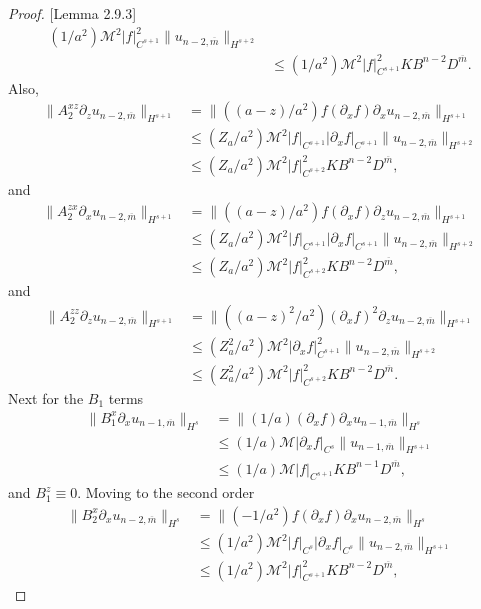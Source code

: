 \begin{proof}{[Lemma 2.9.3]}
\begin{align*}
(1/a^2)\mathcal{M}^2|f|_{C^{s+1}}^2\|u_{n-2, \overline{m}}\|_{H^{s+2}} \\&\le
(1/a^2)\mathcal{M}^2|f|_{C^{s+1}}^2KB^{n-2}D^{\overline{m}}.
\end{align*}
Also,
\begin{align*}
\|A_2^{xz}\partial_z u_{n-2,\overline{m}}\|_{H^{s+1}} &= 
\|((a-z)/a^2)f(\partial_x f)\partial_x u_{n-2,\overline{m}}\|_{H^{s+1}}\\&\le
(Z_a/a^2)\mathcal{M}^2|f|_{C^{s+1}}|\partial_x f|_{C^{s+1}}\|u_{n-2, \overline{m}}\|_{H^{s+2}} \\&\le
(Z_a/a^2)\mathcal{M}^2|f|_{C^{s+2}}^2KB^{n-2}D^{\overline{m}},
\end{align*}
and
\begin{align*}
\|A_2^{zx}\partial_x u_{n-2,\overline{m}}\|_{H^{s+1}} &= 
\|((a-z)/a^2)f(\partial_x f)\partial_z u_{n-2,\overline{m}}\|_{H^{s+1}}\\&\le
(Z_a/a^2)\mathcal{M}^2|f|_{C^{s+1}}|\partial_x f|_{C^{s+1}}\|u_{n-2, \overline{m}}\|_{H^{s+2}} \\&\le
(Z_a/a^2)\mathcal{M}^2|f|_{C^{s+2}}^2KB^{n-2}D^{\overline{m}},
\end{align*}
and
\begin{align*}
\|A_2^{zz}\partial_z u_{n-2,\overline{m}}\|_{H^{s+1}} &= 
\|((a-z)^2/a^2)(\partial_x f)^2\partial_z u_{n-2,\overline{m}}\|_{H^{s+1}}\\&\le
(Z_a^2/a^2)\mathcal{M}^2|\partial_x f|_{C^{s+1}}^2\|u_{n-2, \overline{m}}\|_{H^{s+2}} \\&\le
(Z_a^2/a^2)\mathcal{M}^2|f|_{C^{s+2}}^2KB^{n-2}D^{\overline{m}}.
\end{align*}
Next for the $B_1$ terms
\begin{align*}
\|B_1^{x}\partial_x u_{n-1,\overline{m}}\|_{H^{s}} &= 
\|(1/a)(\partial_x f)\partial_x u_{n-1,\overline{m}}\|_{H^{s}}\\&\le
(1/a)\mathcal{M}|\partial_x f|_{C^{s}}\|u_{n-1, \overline{m}}\|_{H^{s+1}} \\&\le
(1/a)\mathcal{M}|f|_{C^{s+1}}KB^{n-1}D^{\overline{m}},
\end{align*}
and $B_1^z\equiv 0$. Moving to the second order
\begin{align*}
\|B_2^{x}\partial_x u_{n-2,\overline{m}}\|_{H^{s}} &= 
\|(-1/a^2)f(\partial_x f)\partial_x u_{n-2,\overline{m}}\|_{H^{s}}\\&\le
(1/a^2)\mathcal{M}^2|f|_{C^{s}}|\partial_x f|_{C^{s}}\|u_{n-2, \overline{m}}\|_{H^{s+1}} \\&\le
(1/a^2)\mathcal{M}^2|f|_{C^{s+1}}^2KB^{n-2}D^{\overline{m}},

\end{align*}
\end{proof}
